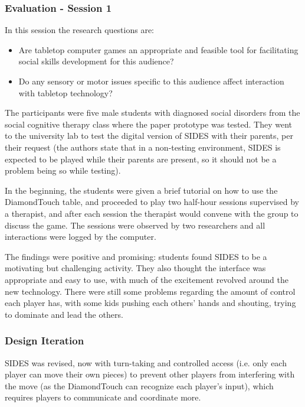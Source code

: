 \documentclass[runningheads]{llncs}
\begin{document}
\subsubsection{Evaluation - Session 1}
\par In this session the research questions are:
\begin{itemize}
    \item Are tabletop computer games an appropriate and feasible tool for facilitating social skills development for this audience?
    \item Do any sensory or motor issues specific to this audience affect interaction with tabletop technology? 
\end{itemize}
\par The participants were five male students with diagnosed social disorders from the social cognitive therapy class where the paper prototype was tested. They went to the university lab to test the digital version of SIDES with their parents, per their request (the authors state that in a non-testing environment, SIDES is expected to be played while their parents are present, so it should not be a problem being so while testing).
\par In the beginning, the students were given a brief tutorial on how to use the DiamondTouch table, and proceeded to play two half-hour sessions supervised by a therapist, and after each session the therapist would convene with the group to discuss the game. The sessions were observed by two researchers and all interactions were logged by the computer.
\par The findings were positive and promising: students found SIDES to be a motivating but challenging activity. They also thought the interface was appropriate and easy to use, with much of the excitement revolved around the new technology. There were still some problems regarding the amount of control each player has, with some kids pushing each others' hands and shouting, trying to dominate and lead the others.

\subsubsection{Design Iteration}
\par SIDES was revised, now with turn-taking and controlled access (i.e. only each player can move their own pieces) to prevent other players from interfering 
with the move (as the DiamondTouch can recognize each player's input), which requires players to communicate and coordinate more.
\end{document}
